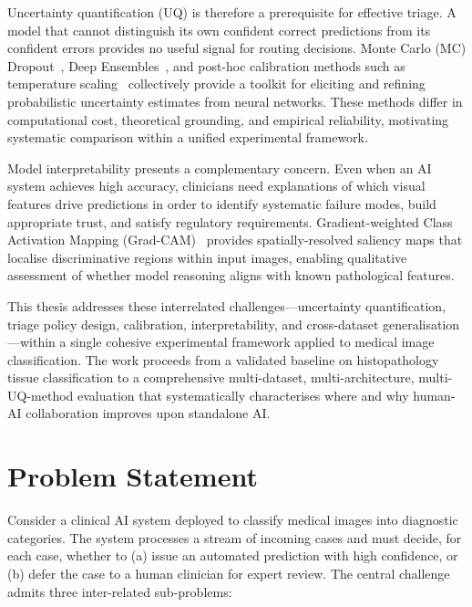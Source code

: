 Uncertainty quantification (UQ) is therefore a prerequisite for effective triage. A model that cannot distinguish its own confident correct predictions from its confident errors provides no useful signal for routing decisions. Monte Carlo (MC) Dropout~\cite{gal2016dropout}, Deep Ensembles~\cite{lakshminarayanan2017simple}, and post-hoc calibration methods such as temperature scaling~\cite{guo2017calibration} collectively provide a toolkit for eliciting and refining probabilistic uncertainty estimates from neural networks. These methods differ in computational cost, theoretical grounding, and empirical reliability, motivating systematic comparison within a unified experimental framework.

Model interpretability presents a complementary concern. Even when an AI system achieves high accuracy, clinicians need explanations of which visual features drive predictions in order to identify systematic failure modes, build appropriate trust, and satisfy regulatory requirements. Gradient-weighted Class Activation Mapping (Grad-CAM)~\cite{selvaraju2017grad} provides spatially-resolved saliency maps that localise discriminative regions within input images, enabling qualitative assessment of whether model reasoning aligns with known pathological features.

This thesis addresses these interrelated challenges—uncertainty quantification, triage policy design, calibration, interpretability, and cross-dataset generalisation—within a single cohesive experimental framework applied to medical image classification. The work proceeds from a validated baseline on histopathology tissue classification to a comprehensive multi-dataset, multi-architecture, multi-UQ-method evaluation that systematically characterises where and why human-AI collaboration improves upon standalone AI.

\section{Problem Statement}

Consider a clinical AI system deployed to classify medical images into diagnostic categories. The system processes a stream of incoming cases and must decide, for each case, whether to (a) issue an automated prediction with high confidence, or (b) defer the case to a human clinician for expert review. The central challenge admits three inter-related sub-problems:

